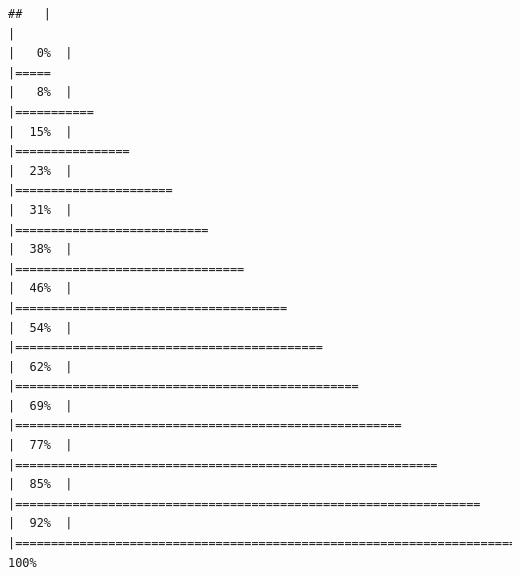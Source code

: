 \documentclass[
]{book}
\begin{document}
\begin{verbatim}
##   |                                                                              |                                                                      |   0%  |                                                                              |=====                                                                 |   8%  |                                                                              |===========                                                           |  15%  |                                                                              |================                                                      |  23%  |                                                                              |======================                                                |  31%  |                                                                              |===========================                                           |  38%  |                                                                              |================================                                      |  46%  |                                                                              |======================================                                |  54%  |                                                                              |===========================================                           |  62%  |                                                                              |================================================                      |  69%  |                                                                              |======================================================                |  77%  |                                                                              |===========================================================           |  85%  |                                                                              |=================================================================     |  92%  |                                                                              |======================================================================| 100%
\end{verbatim}
\end{document}
